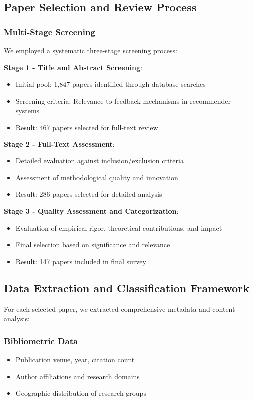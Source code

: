 \subsection{Paper Selection and Review Process}

\subsubsection{Multi-Stage Screening}
We employed a systematic three-stage screening process:

\textbf{Stage 1 - Title and Abstract Screening}:
\begin{itemize}
    \item Initial pool: 1,847 papers identified through database searches
    \item Screening criteria: Relevance to feedback mechanisms in recommender systems
    \item Result: 467 papers selected for full-text review
\end{itemize}

\textbf{Stage 2 - Full-Text Assessment}:
\begin{itemize}
    \item Detailed evaluation against inclusion/exclusion criteria
    \item Assessment of methodological quality and innovation
    \item Result: 286 papers selected for detailed analysis
\end{itemize}

\textbf{Stage 3 - Quality Assessment and Categorization}:
\begin{itemize}
    \item Evaluation of empirical rigor, theoretical contributions, and impact
    \item Final selection based on significance and relevance
    \item Result: 147 papers included in final survey
\end{itemize}

\subsection{Data Extraction and Classification Framework}

For each selected paper, we extracted comprehensive metadata and content analysis:

\subsubsection{Bibliometric Data}
\begin{itemize}
    \item Publication venue, year, citation count
    \item Author affiliations and research domains
    \item Geographic distribution of research groups
\end{itemize}

